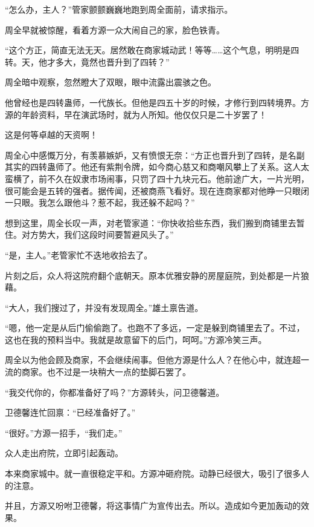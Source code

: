 
\begin{this_body}

“怎么办，主人？”管家颤颤巍巍地跑到周全面前，请求指示。

周全早就被惊醒，看着方源一众大闹自己的家，脸色铁青。

“这个方正，简直无法无天。居然敢在商家城动武！等等……这个气息，明明是四转。天，他才多大，竟然也晋升到了四转？”

周全暗中观察，忽然瞪大了双眼，眼中流露出震骇之色。

他曾经也是四转蛊师，一代族长。但他是四五十岁的时候，才修行到四转境界。方源的年龄资料，早在演武场时，就为人所知。他仅仅只是二十岁罢了！

这是何等卓越的天资啊！

周全心中感慨万分，有羡慕嫉妒，又有愤恨无奈：“方正也晋升到了四转，是名副其实的四转蛊师了。他还有紫荆令牌，如今商心慈又和商嘲风攀上了关系。这人太蛮横了，前不久在奴隶市场闹事，只罚了四十九块元石。他前途广大，一片光明，很可能会是五转的强者。据传闻，还被商燕飞看好。现在连商家都对他睁一只眼闭一只眼。我怎么跟他斗？惹不起，我还躲不起吗？”

想到这里，周全长叹一声，对老管家道：“你快收拾些东西，我们搬到商铺里去暂住。对方势大，我们这段时间要暂避风头了。”

“是，主人。”老管家忙不迭地收拾去了。

片刻之后，众人将这院府翻个底朝天。原本优雅安静的房屋庭院，到处都是一片狼藉。

“大人，我们搜过了，并没有发现周全。”雄土禀告道。

“嗯，他一定是从后门偷偷跑了。也跑不了多远，一定是躲到商铺里去了。不过，这也在我的预料当中。我就是故意留下的后门，呵呵。”方源冷笑三声。

周全以为他会顾及商家，不会继续闹事。但他方源是什么人？在他心中，就连超一流的商家。也不过是一块稍大一点的垫脚石罢了。

“我交代你的，你都准备好了吗？”方源转头，问卫德馨道。

卫德馨连忙回禀：“已经准备好了。”

“很好。”方源一招手，“我们走。”

众人走出府院，立即引起轰动。

本来商家城中。就一直很稳定平和。方源冲砸府院。动静已经很大，吸引了很多人的注意。

并且，方源又吩咐卫德馨，将这事情广为宣传出去。所以。造成如今更加轰动的效果。


\end{this_body}
